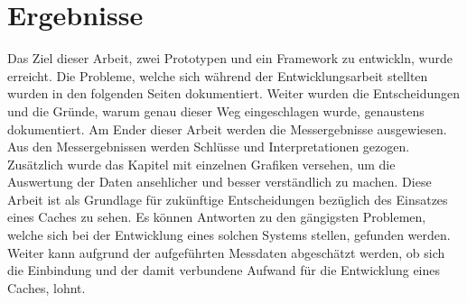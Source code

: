 \section*{Ergebnisse}
Das Ziel dieser Arbeit, zwei Prototypen und ein Framework zu entwickln, wurde erreicht. Die Probleme, welche sich während der Entwicklungsarbeit stellten wurden in den folgenden Seiten dokumentiert. Weiter wurden die Entscheidungen und die Gründe, warum genau dieser Weg eingeschlagen wurde, genaustens dokumentiert.\newline
Am Ender dieser Arbeit werden die Messergebnisse ausgewiesen. Aus den Messergebnissen werden Schlüsse und Interpretationen gezogen. Zusätzlich wurde das Kapitel mit einzelnen Grafiken versehen, um die Auswertung der Daten ansehlicher und besser verständlich zu machen.\newline
Diese Arbeit ist als Grundlage für zukünftige Entscheidungen bezüglich des Einsatzes eines Caches zu sehen. Es können Antworten zu den gängigsten Problemen, welche sich bei der Entwicklung eines solchen Systems stellen, gefunden werden. Weiter kann aufgrund der aufgeführten Messdaten abgeschätzt werden, ob sich die Einbindung und der damit verbundene Aufwand für die Entwicklung eines Caches, lohnt.
